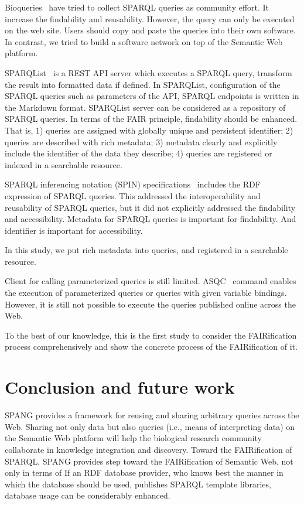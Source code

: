 \documentclass[runningheads]{llncs}
\begin{document}
Bioqueries~\cite{bioqueries} have tried to collect SPARQL queries as community effort. It increase the findability and reusability.
However, the query can only be executed on the web site.
Users should copy and paste the queries into their own software.
In contrast, we tried to build a software network on top of the Semantic Web platform.

SPARQList~\cite{sparqlist} is a REST API server which executes a SPARQL query, transform the result into formatted data if defined. In SPARQList, configuration of the SPARQL queries such as parameters of the API, SPARQL endpoints is written in the Markdown format. SPARQList server can be considered as a repository of SPARQL queries. In terms of the FAIR principle, findability should be enhanced. That is, 1) queries are assigned with globally unique and persistent identifier; 2) queries are described with rich metadata; 3) metadata clearly and explicitly include the identifier of the data they describe; 4) queries are registered or indexed in a searchable resource.

SPARQL inferencing notation (SPIN) specifications~\cite{spin} includes the RDF expression of SPARQL queries. This addressed the interoperability and reusability of SPARQL queries, but it did not explicitly addressed the findability and accessibility. Metadata for SPARQL queries is important for findability. And identifier is important for accessibility.

In this study, we put rich metadata into queries, and registered in a searchable resource.

Client for calling parameterized queries is still limited.
ASQC~\cite{asqc} command enables the execution of parameterized queries or queries with given variable bindings. However, it is still not possible to execute the queries published online across the Web.

To the best of our knowledge, this is the first study to consider the FAIRification process comprehensively and show the concrete process of the FAIRification of it.

\section{Conclusion and future work}
SPANG provides a framework for reusing and sharing arbitrary queries across the Web.
Sharing not only data but also queries (i.e., means of interpreting data) on the Semantic Web platform will help the biological research community collaborate in knowledge integration and discovery.
Toward the FAIRification of SPARQL, SPANG provides step toward the FAIRification of Semantic Web, not only in terms of 
If an RDF database provider,
who knows best the manner in which the database should be used,
publishes SPARQL template libraries, database usage can be considerably enhanced.
\end{document}
